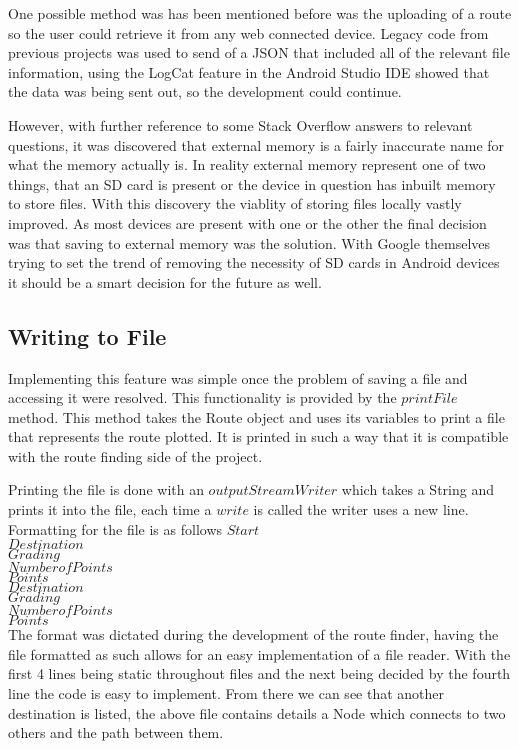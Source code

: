 One possible method was has been mentioned before was the uploading of a route so the user could retrieve it from any web connected device. Legacy code from previous projects was used to send of a JSON that included all of the relevant file information, using the LogCat feature in the Android Studio IDE\cite{as} showed that the data was being sent out, so the development could continue.

However, with further reference to some Stack Overflow answers to relevant questions\cite{check}, it was discovered that external memory is a fairly inaccurate name for what the memory actually is. In reality external memory represent one of two things, that an SD card is present or the device in question has inbuilt memory to store files\cite{storage}. With this discovery the viablity of storing files locally vastly improved. As most devices are present with one or the other the final decision was that saving to external memory was the solution. With Google themselves trying to set the trend of removing the necessity of SD cards in Android devices it should be a smart decision for the future as well. 

\subsection{Writing to File}
Implementing this feature was simple once the problem of saving a file and accessing it were resolved. This functionality is provided by the $printFile$ method. This method takes the Route object and uses its variables to print a file that represents the route plotted. It is printed in such a way that it is compatible with the route finding side of the project. 

Printing the file is done with an $outputStreamWriter$ which takes a String and prints it into the file, each time a $write$ is called the writer uses a new line. Formatting for the file is as follows
$Start$\\
$Destination$\\
$Grading$\\
$Number of Points$\\
$Points$\\
$Destination$\\
$Grading$\\
$Number of Points$\\
$Points$\\
The format was dictated during the development of the route finder, having the file formatted as such allows for an easy implementation of a file reader. With the first 4 lines being static throughout files and the next being decided by the fourth line the code is easy to implement. From there we can see that another destination is listed, the above file contains details a Node which connects to two others and the path between them. 

